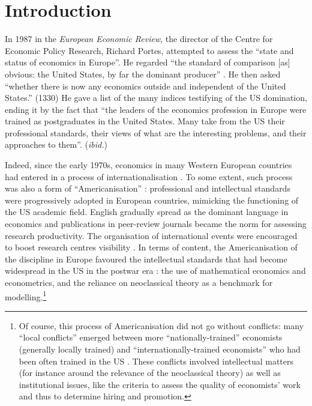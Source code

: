 \documentclass[]{elsarticle} %
\begin{document}
\begin{frontmatter}

  \title{}
  
  \begin{abstract}
  
  \end{abstract}
  
 \end{frontmatter}

\hypertarget{introduction}{%
\section{Introduction}\label{introduction}}

In 1987 in the \emph{European Economic Review}, the director of the
Centre for Economic Policy Research, Richard Portes, attempted to assess
the ``state and status of economics in Europe''. He regarded ``the
standard of comparison {[}as{]} obvious: the United States, by far the
dominant producer'' \citep[1329]{portes1987}. He then asked ``whether
there is now any economics outside and independent of the United
States.'' (1330) He gave a list of the many indices testifying of the US
domination, ending it by the fact that ``the leaders of the economics
profession in Europe were trained as postgraduates in the United States.
Many take from the US their professional standards, their views of what
are the interesting problems, and their approaches to them''.
(\emph{ibid.})

Indeed, since the early 1970s, economics in many Western European
countries had entered in a process of internationalisation
\citep[chapters 3 and 4]{fourcade2006, fourcade2009}. To some extent,
such process was also a form of ``Americanisation''
\citep{coats1996, goutsmedt2021}: professional and intellectual
standards were progressively adopted in European countries, mimicking
the functioning of the US academic field. English gradually spread as
the dominant language in economics \citep{sandelin1997} and publications
in peer-review journals became the norm for assessing research
productivity. The organisation of international events were encouraged
to boost research centres visibility
\citep{cherrier2021, goutsmedt2021}. In terms of content, the
Americanisation of the discipline in Europe favoured the intellectual
standards that had become widespread in the US in the postwar era
\citep{morgan1998}: the use of mathematical economics and econometrics,
and the reliance on neoclassical theory as a benchmark for
modelling.\footnote{Of course, this process of Americanisation did not
  go without conflicts: many ``local conflicts'' emerged between more
  ``nationally-trained'' economists (generally locally trained) and
  ``internationally-trained economists'' who had been often trained in
  the US \citep{fourcade2006}. These conflicts involved intellectual
  matters (for instance around the relevance of the neoclassical theory)
  as well as institutional issues, like the criteria to assess the
  quality of economists' work and thus to determine hiring and
  promotion.}
\end{document}
